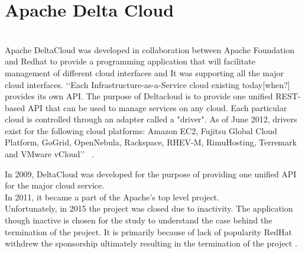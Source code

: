 \section{Apache Delta Cloud}
\\
Apache DeltaCloud was developed in collaboration between Apache Foundation and Redhat
to provide a programming application that will 
facilitate management of different cloud interfaces and
It was supporting all the major cloud interfaces. 
‘‘Each Infrastructure-as-a-Service cloud existing today[when?] provides
its own API. The purpose of Deltacloud is to provide one unified 
REST-based API that can be used to manage services on any cloud. Each particular 
cloud is controlled through an adapter called a "driver". As of June 2012, drivers 
exist for the following cloud platforms: Amazon EC2, Fujitsu Global Cloud Platform, 
GoGrid, OpenNebula, Rackspace, RHEV-M, RimuHosting, Terremark and VMware vCloud’’ 
~\cite{hid-sp18-417-wiki-deltacloud}.

In 2009, DeltaCloud was developed for the purpose of providing one unified 
API for the major cloud service. \\
In 2011, it became a part of the Apache’s top level project. \\ Unfortunately,
in 2015 the project was closed due to inactivity. 
The application though inactive is chosen for the study to understand 
the case behind the termination of the project. 
It is primarily because of lack of popularity RedHat withdrew the 
sponsorship ultimately resulting in the 
termination of the project .
